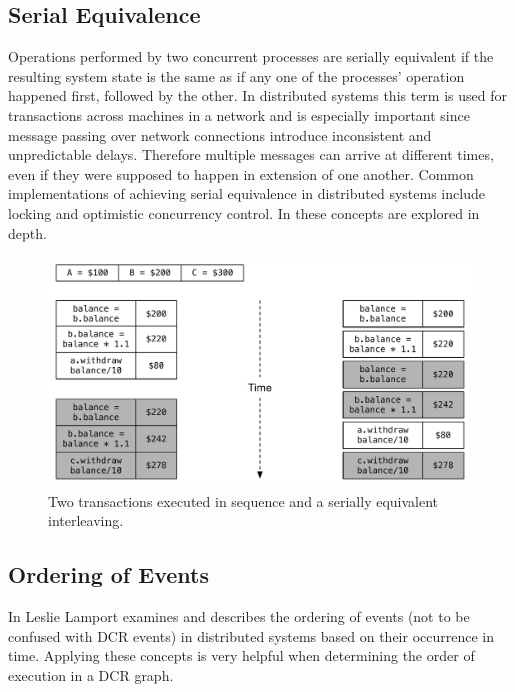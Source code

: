 		\subsection{Serial Equivalence}
		Operations performed by two concurrent processes are serially equivalent if the resulting system state is the same as if any one of the processes' operation happened first, followed by the other. In distributed systems this term is used for transactions across machines in a network and is especially important since message passing over network connections introduce inconsistent and unpredictable delays. Therefore multiple messages can arrive at different times, even if they were supposed to happen in extension of one another. Common implementations of achieving serial equivalence in distributed systems include locking and optimistic concurrency control. In \cite{Coulouris:2011:DSC:2029110:chapter16} these concepts are explored in depth.
		
		\begin{figure}[H]
		\centering
		\includegraphics[width=\textwidth]{2background/images/serial-equivalence.pdf}
		\caption{Two transactions executed in sequence and a serially equivalent interleaving.}
		\label{fig:background:serial-equivalence}
		\end{figure}
		
		\subsection{Ordering of Events}\label{subsec:orderingofevents}
		In \cite{Lamport:1978:TCO:359545.359563} Leslie Lamport examines and describes the ordering of events (not to be confused with DCR events) in distributed systems based on their occurrence in time. Applying these concepts is very helpful when determining the order of execution in a DCR graph. 
		
